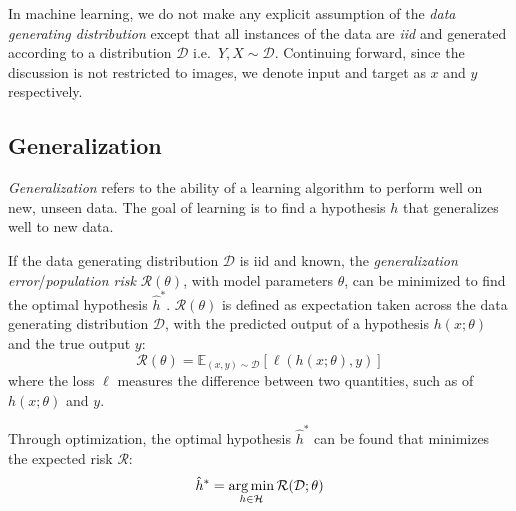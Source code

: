 In machine learning, we do not make any explicit assumption of the \textit{data generating distribution} except that all instances of the data are \textit{\gls{iid}} and generated according to a distribution $\mathcal{D}$ i.e.\ $Y, X \sim \mathcal{D}$. Continuing forward, since the discussion is not restricted to images, we denote input and target as $x$ and $y$ respectively. 

\subsection{Generalization}
\textit{Generalization} refers to the ability of a learning algorithm to perform well on new, unseen data. The goal of learning is to find a hypothesis $h$ that generalizes well to new data. 

If the data generating distribution $\mathcal{D}$ is \gls{iid} and known, the \textit{generalization error}/\textit{population risk} $\mathcal{R}(\theta)$, with model parameters $\theta$, can be minimized to find the optimal hypothesis $\hat{h}^*$. $\mathcal{R}(\theta)$ is defined as expectation taken across the data generating distribution $\mathcal{D}$, with the predicted output of a hypothesis $h(x; \theta)$ and the true output $y$:
\begin{equation}
    \mathcal{R}(\theta) = \mathbb{E}_{(x, y) \sim \mathcal{D}} \left[ \ell(h(x; \theta), y) \right]
\end{equation}
where the loss $\ell$ measures the difference between two quantities, such as of $h(x; \theta)$ and $y$.

Through optimization, the optimal hypothesis $\hat{h}^*$ can be found that minimizes the expected risk $\mathcal{R}$:
\begin{equation}
    \hat{h}^* = \operatorname*{arg\,min}_{h \in \mathcal{H}} \mathcal{R}(\mathcal{D}; \theta)
\end{equation}



